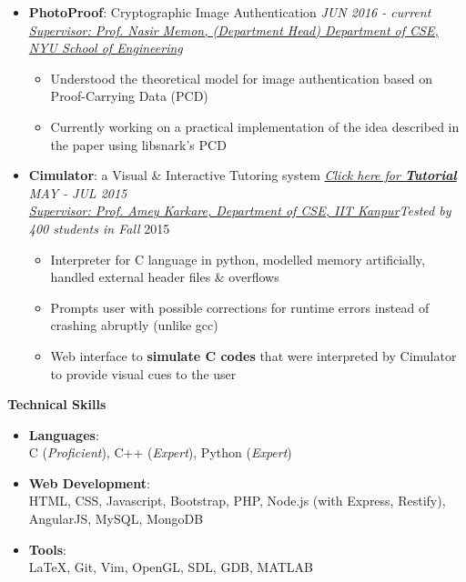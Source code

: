 \documentclass[letterpaper,11pt]{article}
\begin{document}
{\begin{itemize}
    \item \textbf{PhotoProof}: Cryptographic Image Authentication \hfill \textit{JUN 2016 - current}\\
    \href{http://engineering.nyu.edu/people/nasir-memon}{\textit{Supervisor: Prof. Nasir Memon, (Department Head) Department of CSE, NYU School of Engineering}}
    \begin{itemize}
        \item Understood the theoretical model for image authentication based on Proof-Carrying Data (PCD)
        \item Currently working on a practical implementation of the idea described in the paper using libsnark's PCD
    \end{itemize}
    \item \textbf{Cimulator}: a Visual \& Interactive Tutoring system\hspace{0.2in} \href{http://home.iitk.ac.in/~kunalkap/Cimulator.html}{\textit{Click here for \textbf{Tutorial}}} \hfill \textit{MAY - JUL 2015} \\
    \href{http://www.cse.iitk.ac.in/users/karkare/}{\textit{Supervisor: Prof. Amey Karkare, Department of CSE, IIT Kanpur}}\hfill \textit{Tested by 400 students in Fall} 2015\\
        \begin{itemize}
            \item Interpreter for C language in python, modelled memory artificially, handled external header files \& overflows
            \item Prompts user with possible corrections for runtime errors instead of crashing abruptly (unlike gcc)
            \item Web interface to \textbf{simulate C codes} that were interpreted by Cimulator to provide visual cues to the user
        \end{itemize}
\end{itemize}

\Large{\textbf{Technical Skills}}
\small
\begin{itemize}
    \item \textbf{Languages}:\\
        C (\textit{Proficient}), C++ (\textit{Expert}), Python (\textit{Expert})
    \item \textbf{Web Development}:\\
        HTML, CSS, Javascript, Bootstrap, PHP, Node.js (with Express, Restify), AngularJS, MySQL, MongoDB
    \item \textbf{Tools}:\\
        \LaTeX, Git, Vim, OpenGL, SDL, GDB, MATLAB
\end{itemize}

}
\end{document}
